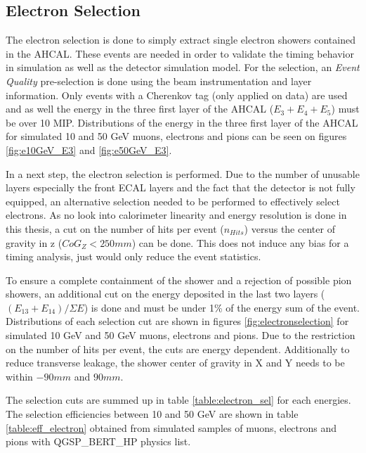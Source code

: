 \subsection{Electron Selection}
\label{subsec:elec_sel}

The electron selection is done to simply extract single electron showers contained in the AHCAL. These events are needed in order to validate the timing behavior in simulation as well as the detector simulation model. For the selection, an \textit{Event Quality} pre-selection is done using the beam instrumentation and layer information. Only events with a Cherenkov tag (only applied on data) are used and as well the energy in the three first layer of the AHCAL ($E_3+E_4+E_5$) must be over 10 MIP. Distributions of the energy in the three first layer of the AHCAL for simulated 10 and 50 GeV muons, electrons and pions can be seen on figures \ref{fig:e10GeV_E3} and \ref{fig:e50GeV_E3}.

In a next step, the electron selection is performed. Due to the number of unusable layers especially the front ECAL layers and the fact that the detector is not fully equipped, an alternative selection needed to be performed to effectively select electrons. As no look into calorimeter linearity and energy resolution is done in this thesis, a cut on the number of hits per event ($n_{Hits}$) versus the center of gravity in z ($CoG_Z < 250 mm$) can be done. This does not induce any bias for a timing analysis, just would only reduce the event statistics.

To ensure a complete containment of the shower and a rejection of possible pion showers, an additional cut on the energy deposited in the last two layers ($(E_{13}+E_{14})/\Sigma E$) is done and must be under 1\% of the energy sum of the event. Distributions of each selection cut are shown in figures \ref{fig:electronselection} for simulated 10 GeV and 50 GeV muons, electrons and pions. Due to the restriction on the number of hits per event, the cuts are energy dependent. Additionally to reduce transverse leakage, the shower center of gravity in X and Y needs to be within $-90 mm$ and $90 mm$.

The selection cuts are summed up in table \ref{table:electron_sel} for each energies. The selection efficiencies between 10 and 50 GeV are shown in table \ref{table:eff_electron} obtained from simulated samples of muons, electrons and pions with QGSP\_BERT\_HP physics list.

